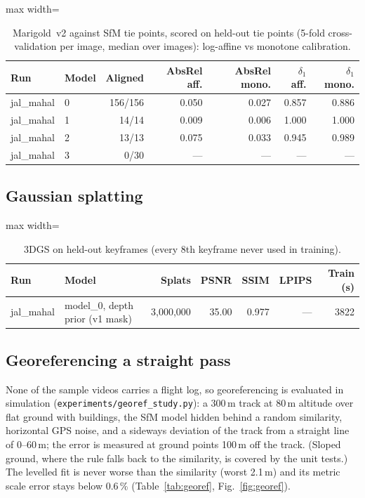 \begin{table}[htbp]
\centering\small
\caption{Marigold~v2 against SfM tie points, scored on held-out tie points (5-fold cross-validation per image, median over images): log-affine vs monotone calibration.}\label{tab:depth}
\begin{adjustbox}{max width=\linewidth}
\begin{tabular}{llrrrrr}
\toprule
Run & Model & Aligned & AbsRel aff. & AbsRel mono. & $\delta_1$ aff. & $\delta_1$ mono. \\
\midrule
jal\_mahal & 0 & 156/156 & 0.050 & 0.027 & 0.857 & 0.886 \\
jal\_mahal & 1 & 14/14 & 0.009 & 0.006 & 1.000 & 1.000 \\
jal\_mahal & 2 & 13/13 & 0.075 & 0.033 & 0.945 & 0.989 \\
jal\_mahal & 3 & 0/30 & --- & --- & --- & --- \\
\bottomrule
\end{tabular}
\end{adjustbox}
\end{table}

\subsection{Gaussian splatting}

\begin{table}[htbp]
\centering\small
\caption{3DGS on held-out keyframes (every 8th keyframe never used in training).}\label{tab:splat}
\begin{adjustbox}{max width=\linewidth}
\begin{tabular}{llrrrrr}
\toprule
Run & Model & Splats & PSNR & SSIM & LPIPS & Train (s) \\
\midrule
jal\_mahal & model\_0, depth prior (v1 mask) & 3{,}000{,}000 & 35.00 & 0.977 & --- & 3822 \\
\bottomrule
\end{tabular}
\end{adjustbox}
\end{table}

\subsection{Georeferencing a straight pass}

None of the sample videos carries a flight log, so georeferencing is evaluated in simulation (\texttt{experiments/georef\_study.py}): a 300\,m track at 80\,m altitude over flat ground with buildings, the SfM model hidden behind a random similarity, horizontal GPS noise, and a sideways deviation of the track from a straight line of 0--60\,m; the error is measured at ground points 100\,m off the track. (Sloped ground, where the rule falls back to the similarity, is covered by the unit tests.) The levelled fit is never worse than the similarity (worst 2.1\,m) and its metric scale error stays below 0.6\,\% (Table~\ref{tab:georef}, Fig.~\ref{fig:georef}).

